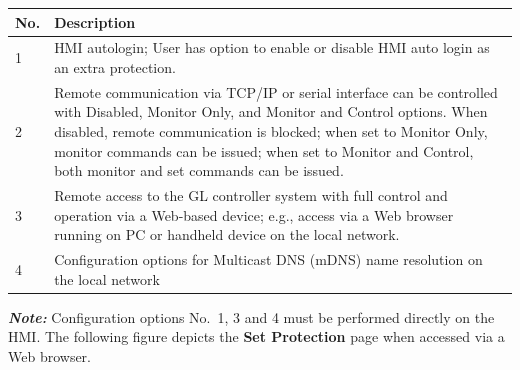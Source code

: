 \begin{longtable}[]{@{}ll@{}}
\toprule
\begin{minipage}[b]{0.07\columnwidth}\raggedright
No.\strut
\end{minipage} & \begin{minipage}[b]{0.88\columnwidth}\raggedright
Description\strut
\end{minipage}\tabularnewline
\midrule
\endhead
\begin{minipage}[t]{0.07\columnwidth}\raggedright
1\strut
\end{minipage} & \begin{minipage}[t]{0.88\columnwidth}\raggedright
HMI autologin; User has option to enable or disable HMI auto login as an
extra protection.\strut
\end{minipage}\tabularnewline
\begin{minipage}[t]{0.07\columnwidth}\raggedright
2\strut
\end{minipage} & \begin{minipage}[t]{0.88\columnwidth}\raggedright
Remote communication via TCP/IP or serial interface can be controlled
with Disabled, Monitor Only, and Monitor and Control options. When
disabled, remote communication is blocked; when set to Monitor Only,
monitor commands can be issued; when set to Monitor and Control, both
monitor and set commands can be issued.\strut
\end{minipage}\tabularnewline
\begin{minipage}[t]{0.07\columnwidth}\raggedright
3\strut
\end{minipage} & \begin{minipage}[t]{0.88\columnwidth}\raggedright
Remote access to the GL controller system with full control and
operation via a Web-based device; e.g., access via a Web browser running
on PC or handheld device on the local network.\strut
\end{minipage}\tabularnewline
\begin{minipage}[t]{0.07\columnwidth}\raggedright
4\strut
\end{minipage} & \begin{minipage}[t]{0.88\columnwidth}\raggedright
Configuration options for Multicast DNS (mDNS) name resolution on the
local network\strut
\end{minipage}\tabularnewline
\bottomrule
\end{longtable}

\textbf{\emph{Note:}} Configuration options No.~1, 3 and 4 must be
performed directly on the HMI. The following figure depicts the
\textbf{Set Protection} page when accessed via a Web browser.

